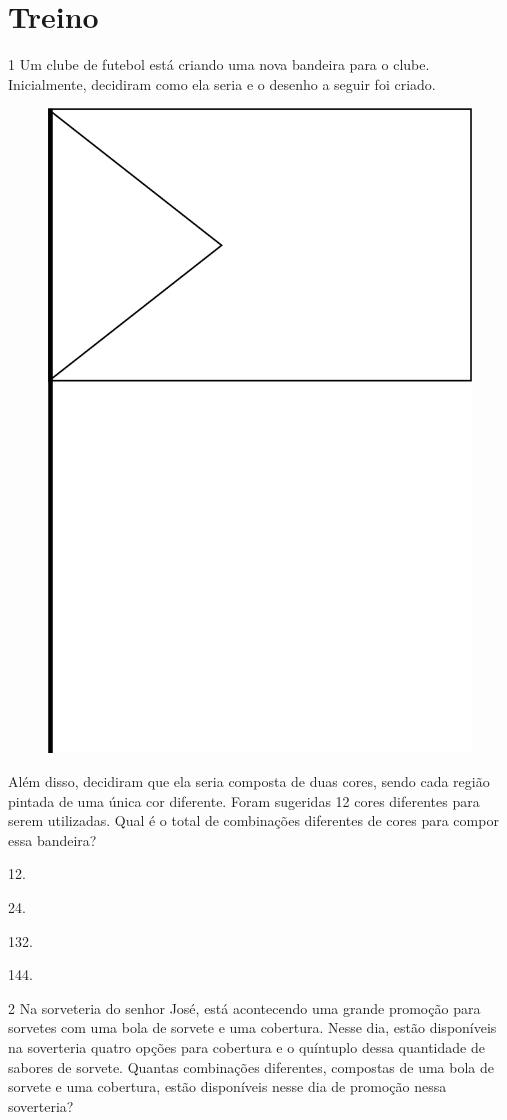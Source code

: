 \begin{mdframed}[linewidth=2pt,linecolor=salmao,roundcorner=2pt]
\vspace{2cm}
\end{mdframed}

\section{Treino}

\num{1} Um clube de futebol está criando uma nova bandeira para o clube.
Inicialmente, decidiram como ela seria e o desenho a seguir foi criado.

\begin{figure}[htpb!]
\centering
\includegraphics[width=.2\textwidth]{media/image74.png}
\end{figure}

Além disso, decidiram que ela seria composta de duas cores, sendo cada
região pintada de uma única cor diferente. Foram sugeridas 12 cores
diferentes para serem utilizadas. Qual é o total de combinações
diferentes de cores para compor essa bandeira?

\begin{multicols}{2}
\begin{escolha}
\item
  12.
\item
  24.
\item
  132.
\item
  144.
\end{escolha}
\end{multicols}

\num{2} Na sorveteria do senhor José, está acontecendo uma grande promoção para
sorvetes com uma bola de sorvete e uma cobertura. Nesse dia, estão
disponíveis na soverteria quatro opções para cobertura e o quíntuplo dessa
quantidade de sabores de sorvete. Quantas combinações diferentes, compostas de uma bola de
sorvete e uma cobertura, estão disponíveis nesse dia de promoção nessa
soverteria?

